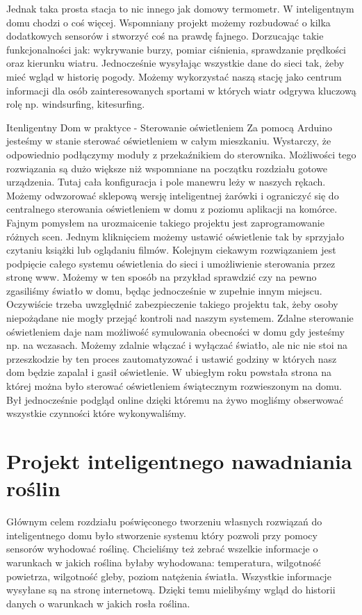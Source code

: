 \documentclass[brudnopis]{xmgr}
\begin{document}
Jednak taka prosta stacja to nic innego jak domowy termometr. W inteligentnym domu chodzi o coś więcej. Wspomniany projekt możemy rozbudować o kilka dodatkowych sensorów i stworzyć coś na prawdę fajnego. 
Dorzucając takie funkcjonalności jak: wykrywanie burzy, pomiar ciśnienia, sprawdzanie prędkości oraz kierunku wiatru. Jednocześnie wysyłając wszystkie dane do sieci tak, żeby mieć wgląd w historię pogody. Możemy wykorzystać naszą stację jako centrum informacji dla osób zainteresowanych sportami w których wiatr odgrywa kluczową rolę np. windsurfing, kitesurfing. 

Itenligentny Dom w praktyce - Sterowanie oświetleniem
Za pomocą Arduino jesteśmy w stanie sterować oświetleniem w całym mieszkaniu. Wystarczy, że odpowiednio podłączymy moduły z przekaźnikiem do sterownika. Możliwości tego rozwiązania są dużo większe niż wspomniane na początku rozdziału gotowe urządzenia. Tutaj cała konfiguracja i pole manewru leży w naszych rękach. Możemy odwzorować sklepową wersję inteligentnej żarówki i ograniczyć się do centralnego sterowania oświetleniem w domu z poziomu aplikacji na komórce.
Fajnym pomysłem na urozmaicenie takiego projektu jest zaprogramowanie różnych scen. Jednym kliknięciem możemy ustawić oświetlenie tak by sprzyjało czytaniu książki lub oglądaniu filmów.
Kolejnym ciekawym rozwiązaniem jest podpięcie całego systemu oświetlenia do sieci i umożliwienie sterowania przez stronę www. Możemy w ten sposób na przykład sprawdzić czy na pewno zgasiliśmy światło w domu, będąc jednocześnie w zupełnie innym miejscu. Oczywiście trzeba uwzględnić zabezpieczenie takiego projektu tak, żeby osoby niepożądane nie mogły przejąć kontroli nad naszym systemem. Zdalne sterowanie oświetleniem daje nam możliwość symulowania obecności w domu gdy jesteśmy np. na wczasach. Możemy zdalnie włączać i wyłączać światło, ale nic nie stoi na przeszkodzie by ten proces zautomatyzować i ustawić godziny w których nasz dom będzie zapalał i gasił oświetlenie.
W ubiegłym roku powstała strona na której można było sterować oświetleniem świątecznym rozwieszonym na domu. Był jednocześnie podgląd online dzięki któremu na żywo mogliśmy obserwować wszystkie czynności które wykonywaliśmy. 

\section{Projekt inteligentnego nawadniania roślin}

Głównym celem rozdziału poświęconego tworzeniu własnych rozwiązań do inteligentnego domu było stworzenie systemu który pozwoli przy pomocy sensorów wyhodować roślinę. Chcieliśmy też zebrać wszelkie informacje o warunkach w jakich roślina byłaby wyhodowana: temperatura, wilgotność powietrza, wilgotność gleby, poziom natężenia światła. Wszystkie informacje wysyłane są na stronę internetową. Dzięki temu mielibyśmy wgląd do historii danych o warunkach w jakich rosła roślina. 
\end{document}
